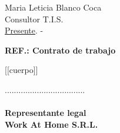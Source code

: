 \documentclass[letterpaper,12pt]{letter}
\begin{document}
\date{\today}
\begin{letter}{ Maria Leticia Blanco Coca \\ Consultor T.I.S. \\ \underline {Presente}. -}

\begin{center}
	\opening{\textbf{REF.: Contrato de trabajo }}
\end{center}

[[cuerpo]]

\vspace{2cm}

\begin{center}
...................................\\
\\
{\bfseries Representante legal \\ Work At Home S.R.L.}
\end{center}

\end{letter}
\end{document}
